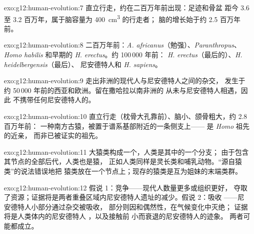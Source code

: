 \begin{solution}{exo:g12:human-evolution:7}
直立行走，约在二百万年前出现：足迹和骨盆
距今 3.6 至 3.2 百万年，属于脑容量为 \qty{400}{cm^3} 的行走者；
脑的增长始于约 2.5 百万年前。
\end{solution}

\begin{solution}{exo:g12:human-evolution:8}
二百万年前：\emph{A. africanus}（勉强）、\emph{Paranthropus}、
\emph{Homo habilis} 和早期的 \emph{H. erectus}。约 100\,000 年前：
\emph{H. erectus}（最后的）、\emph{H. heidelbergensis}（最后）、
尼安德特人和 \emph{H. sapiens}。
\end{solution}

\begin{solution}{exo:g12:human-evolution:9}
走出非洲的现代人与尼安德特人之间的杂交，
发生于约 50\,000 年前的西亚和欧洲。留在撒哈拉以南非洲的
从未与尼安德特人相遇，因此
不携带任何尼安德特人的。
\end{solution}

\begin{solution}{exo:g12:human-evolution:10}
直立行走（枕骨大孔靠前）、脑小、颌骨粗大，约 2.8 百万年前：
一种南方古猿，被置于谱系基部附近的一条侧支上——
是 \emph{Homo} 祖先的近亲，
而非已被证实的祖先。
\end{solution}

\begin{solution}{exo:g12:human-evolution:11}
大猿类构成一个，人类是其中的一个分支；
由于包含其节点的全部后代，人类也是猿，
正如人类同样是灵长类和哺乳动物。“源自猿类”的说法错误地把
猿类放在一个节点上；现存的猿类是互为姐妹的末端类群。
\end{solution}

\begin{solution}{exo:g12:human-evolution:12}
假说 1：竞争——现代人数量更多或组织更好，
夺取了资源；证据将是两者重叠区域内尼安德特人遗址的减少。假说 2：吸收
——尼安德特人小部分通过杂交被吸收，
部分则因和偶然性，在气候变化中灭绝；
证据将是人类体内的尼安德特人 ，以及接触前
小而衰退的尼安德特人的迹象。
两者可能都成立。
\end{solution}

